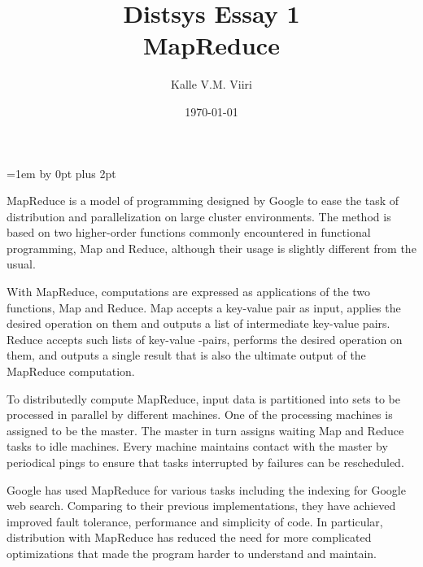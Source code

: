\documentclass[12pt,a4paper,titlepage]{article}
\title{Distsys Essay 1 \\ MapReduce \vspace{0.5em}}
\author{Kalle V.M. Viiri}
\date{\today}
\begin{document}
\setcounter{page}{1}
\parskip=1em \advance\parskip by 0pt plus 2pt

\maketitle

MapReduce\cite{mapreduce} is a model of programming designed by Google to ease the task of distribution and parallelization on large cluster environments. The method is based on two higher-order functions commonly encountered in functional programming, Map and Reduce, although their usage is slightly different from the usual.

With MapReduce, computations are expressed as applications of the two functions, Map and Reduce. Map accepts a key-value pair as input, applies the desired operation on them and outputs a list of intermediate key-value pairs. Reduce accepts such lists of key-value -pairs, performs the desired operation on them, and outputs a single result that is also the ultimate output of the MapReduce computation.

To distributedly compute MapReduce, input data is partitioned into sets to be processed in parallel by different machines. One of the processing machines is assigned to be the master. The master in turn assigns waiting Map and Reduce tasks to idle machines. Every machine maintains contact with the master by periodical pings to ensure that tasks interrupted by failures can be rescheduled.

Google has used MapReduce for various tasks including the indexing for Google web search. Comparing to their previous implementations, they have achieved improved fault tolerance, performance and simplicity of code. In particular, distribution with MapReduce has reduced the need for more complicated optimizations that made the program harder to understand and maintain.



\end{document}
